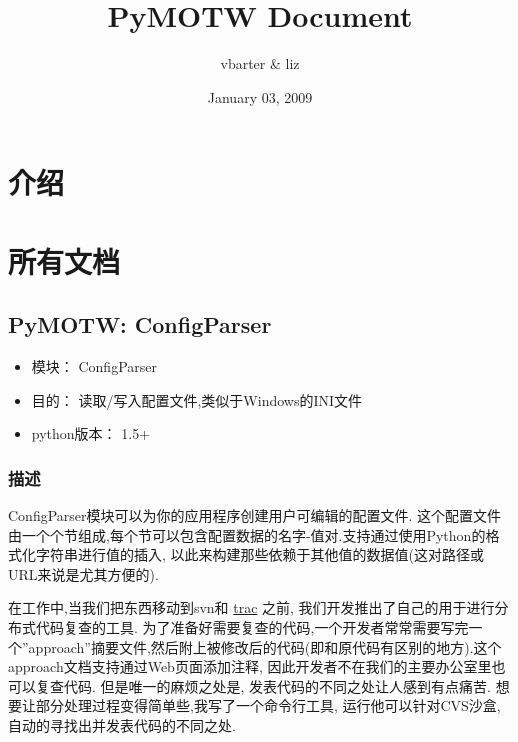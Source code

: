 \documentclass[a4paper,10pt,english]{manual}
\title{PyMOTW Document}
\date{January 03, 2009}
\author{vbarter & liz}
\begin{document}
\maketitle
\tableofcontents



\resetcurrentobjects


\chapter{介绍}

\resetcurrentobjects


\chapter{所有文档}

\resetcurrentobjects


\section{PyMOTW: ConfigParser}
\begin{itemize}
\item {} 
模块： ConfigParser

\item {} 
目的： 读取/写入配置文件,类似于Windows的INI文件

\item {} 
python版本： 1.5+

\end{itemize}


\subsection{描述}

ConfigParser模块可以为你的应用程序创建用户可编辑的配置文件. 这个配置文件由一个个节组成,每个节可以包含配置数据的名字-值对.支持通过使用Python的格式化字符串进行值的插入, 以此来构建那些依赖于其他值的数据值(这对路径或URL来说是尤其方便的).

在工作中,当我们把东西移动到svn和 \href{http://trac.edgewall.org/}{trac} 之前, 我们开发推出了自己的用于进行分布式代码复查的工具. 为了准备好需要复查的代码,一个开发者常常需要写完一个''approach''摘要文件,然后附上被修改后的代码(即和原代码有区别的地方).这个 approach文档支持通过Web页面添加注释, 因此开发者不在我们的主要办公室里也可以复查代码. 但是唯一的麻烦之处是, 发表代码的不同之处让人感到有点痛苦. 想要让部分处理过程变得简单些,我写了一个命令行工具, 运行他可以针对CVS沙盒,自动的寻找出并发表代码的不同之处.
\end{document}
